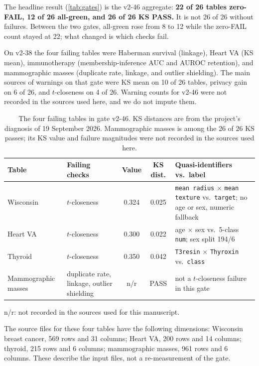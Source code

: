 \documentclass[11pt,a4paper]{article}
\begin{document}
The headline result (\cref{tab:gates}) is the v2-46 aggregate: \textbf{22 of 26 tables zero-FAIL, 12 of 26 all-green, and 26 of 26 KS PASS.} It is not 26 of 26 without failures. Between the two gates, all-green rose from 8 to 12 while the zero-FAIL count stayed at 22; what changed is which checks fail.

On v2-38 the four failing tables were Haberman survival (linkage), Heart VA (KS mean), immunotherapy (membership-inference AUC and AUROC retention), and mammographic masses (duplicate rate, linkage, and outlier shielding). The main sources of warnings on that gate were KS mean on 10 of 26 tables, privacy gain on 6 of 26, and $t$-closeness on 4 of 26. Warning counts for v2-46 were not recorded in the sources used here, and we do not impute them.

\begin{table}[t]
\centering
\small
\caption{The four failing tables in gate v2-46. KS distances are from the project's diagnosis of 19 September 2026. Mammographic masses is among the 26 of 26 KS passes; its KS value and failure magnitudes were not recorded in the sources used here.}
\label{tab:failures}
\begin{tabularx}{\textwidth}{@{}>{\raggedright\arraybackslash}p{2.4cm} >{\raggedright\arraybackslash}p{2.6cm} c c L@{}}
\toprule
Table & Failing checks & Value & KS dist. & Quasi-identifiers vs.\ label \\
\midrule
Wisconsin & $t$-closeness & 0.324 & 0.025 & \texttt{mean radius} $\times$ \texttt{mean texture} vs.\ \texttt{target}; no age or sex, numeric fallback \\
Heart VA & $t$-closeness & 0.300 & 0.022 & age $\times$ sex vs.\ 5-class \texttt{num}; sex split 194/6 \\
Thyroid & $t$-closeness & 0.350 & 0.042 & \texttt{T3resin} $\times$ \texttt{Thyroxin} vs.\ \texttt{class} \\
Mammographic masses & duplicate rate, linkage, outlier shielding & n/r & PASS & not a $t$-closeness failure in this gate \\
\bottomrule
\end{tabularx}

\smallskip
\raggedright\footnotesize n/r: not recorded in the sources used for this manuscript.
\end{table}

The source files for these four tables have the following dimensions: Wisconsin breast cancer, 569 rows and 31 columns; Heart VA, 200 rows and 14 columns; thyroid, 215 rows and 6 columns; mammographic masses, 961 rows and 6 columns. These describe the input files, not a re-measurement of the gate.
\end{document}
